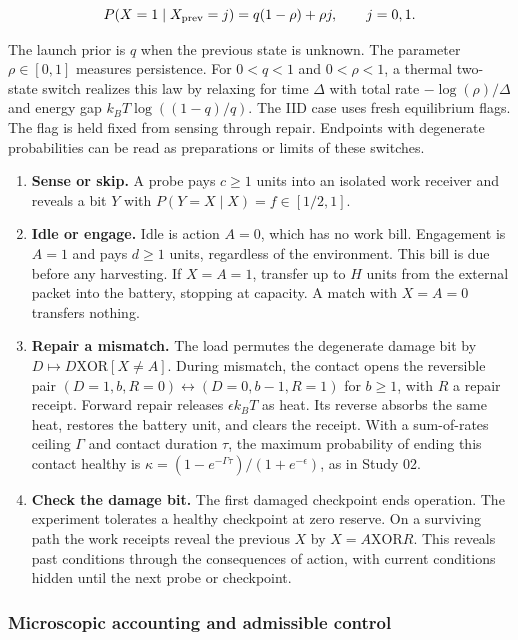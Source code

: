 \documentclass[
  11pt,
]{article}
\providecommand{\tightlist}{%
  \setlength{\itemsep}{0pt}\setlength{\parskip}{0pt}}
\begin{document}
\[
P(X=1\mid X_{\rm prev}=j)=q(1-\rho)+\rho j,\qquad j=0,1 .
\]

The launch prior is \(q\) when the previous state is unknown. The
parameter \(\rho\in[0,1]\) measures persistence. For \(0<q<1\) and
\(0<\rho<1\), a thermal two-state switch realizes this law by relaxing
for time \(\Delta\) with total rate \(-\log(\rho)/\Delta\) and energy
gap \(k_BT\log((1-q)/q)\). The IID case uses fresh equilibrium flags.
The flag is held fixed from sensing through repair. Endpoints with
degenerate probabilities can be read as preparations or limits of these
switches.

\begin{enumerate}
\def\labelenumi{\arabic{enumi}.}
\tightlist
\item
  \textbf{Sense or skip.} A probe pays \(c\ge1\) units into an isolated
  work receiver and reveals a bit \(Y\) with
  \(P(Y=X\mid X)=f\in[1/2,1]\).
\item
  \textbf{Idle or engage.} Idle is action \(A=0\), which has no work
  bill. Engagement is \(A=1\) and pays \(d\ge1\) units, regardless of
  the environment. This bill is due before any harvesting. If \(X=A=1\),
  transfer up to \(H\) units from the external packet into the battery,
  stopping at capacity. A match with \(X=A=0\) transfers nothing.
\item
  \textbf{Repair a mismatch.} The load permutes the degenerate damage
  bit by \(D\mapsto D\mathbin{\mathrm{XOR}}[X\ne A]\). During mismatch,
  the contact opens the reversible pair
  \((D=1,b,R=0)\leftrightarrow(D=0,b-1,R=1)\) for \(b\ge1\), with \(R\)
  a repair receipt. Forward repair releases \(\epsilon k_BT\) as heat.
  Its reverse absorbs the same heat, restores the battery unit, and
  clears the receipt. With a sum-of-rates ceiling \(\Gamma\) and contact
  duration \(\tau\), the maximum probability of ending this contact
  healthy is \(\kappa=(1-e^{-\Gamma\tau})/(1+e^{-\epsilon})\), as in
  Study 02.
\item
  \textbf{Check the damage bit.} The first damaged checkpoint ends
  operation. The experiment tolerates a healthy checkpoint at zero
  reserve. On a surviving path the work receipts reveal the previous
  \(X\) by \(X=A
  \mathbin{\mathrm{XOR}} R\). This reveals past conditions through the
  consequences of action, with current conditions hidden until the next
  probe or checkpoint.
\end{enumerate}

\subsubsection{Microscopic accounting and admissible
control}\label{microscopic-accounting-and-admissible-control}
\end{document}
